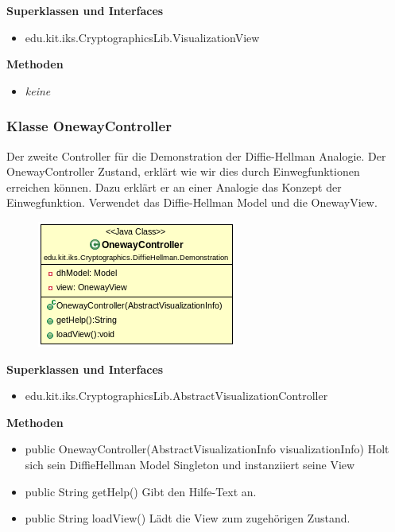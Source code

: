 \documentclass{article}
\begin{document}
      \textbf{Superklassen und Interfaces}
      \begin{itemize}
        \item edu.kit.iks.CryptographicsLib.VisualizationView
      \end{itemize}

      \textbf{Methoden}
      \begin{itemize}
        \item \textit{keine}
      \end{itemize}

\subsubsection{Klasse OnewayController}
      Der zweite Controller für die Demonstration der Diffie-Hellman Analogie.
      Der OnewayController Zustand, erklärt wie wir dies durch Einwegfunktionen
      erreichen können. Dazu erklärt er an einer Analogie das Konzept
      der Einwegfunktion.
      Verwendet das Diffie-Hellman Model und die OnewayView.

      \begin{figure}[H]
        \centering
        \includegraphics{resources/edu-kit-iks-Cryptographics-DiffieHellman-Demonstration-OnewayController}
      \end{figure}

      \textbf{Superklassen und Interfaces}
      \begin{itemize}
        \item edu.kit.iks.CryptographicsLib.AbstractVisualizationController
      \end{itemize}

      \textbf{Methoden}
      \begin{itemize}
          \item public OnewayController(AbstractVisualizationInfo visualizationInfo) \newline
              Holt sich sein DiffieHellman Model Singleton und instanziiert seine View
        \item public String getHelp() \newline
        Gibt den Hilfe-Text an.
        \item public String loadView() \newline
        Lädt die View zum zugehörigen Zustand.
      \end{itemize}
\end{document}
